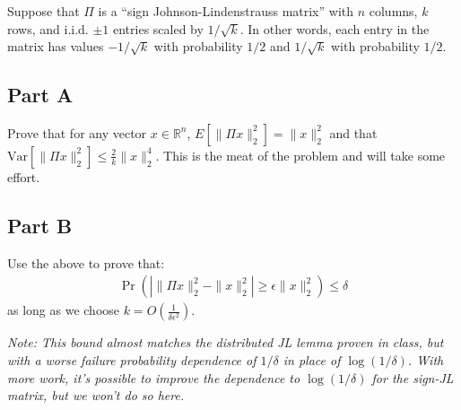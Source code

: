 \documentclass{article}
\begin{document}
Suppose that \(\Pi\) is a ``sign Johnson-Lindenstrauss matrix'' with \(n\) columns, \(k\) rows, and i.i.d. \(\pm 1\) entries scaled by \(1/\sqrt{k}\). In other words, each entry in the matrix has values \(-1/\sqrt{k}\) with probability \(1/2\) and \(1/\sqrt{k}\) with probability \(1/2\).

\hypertarget{part-a}{%
\subsection*{Part A}\label{part-a}}

Prove that for any vector \(x \in \mathbb{R}^n\), \(E[\|\Pi x\|_2^2] = \|x\|_2^2\) and that \(\text{Var}[\|\Pi x\|_2^2] \leq \frac{2}{k} \|x\|_2^4\). This is the meat of the problem and will take some effort.

\hypertarget{part-b}{%
\subsection*{Part B}\label{part-b}}

Use the above to prove that: \begin{align*}
\Pr \left( \left| \|\Pi x\|_2^2 - \|x\|_2^2 \right| \geq \epsilon \|x\|_2^2 \right) \leq \delta
\end{align*} as long as we choose \(k = O\left( \frac{1}{\delta \epsilon^2} \right)\).

\emph{Note: This bound almost matches the distributed JL lemma proven in class, but with a worse failure probability dependence of \(1/\delta\) in place of \(\log(1/\delta)\). With more work, it's possible to improve the dependence to \(\log(1/\delta)\) for the sign-JL matrix, but we won't do so here.}
\end{document}
